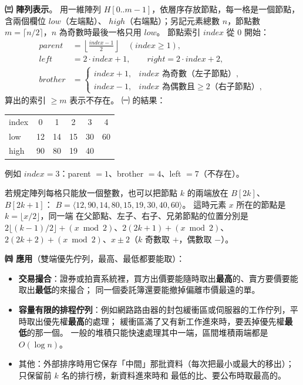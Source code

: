 \begin{pastsoln}
\textbf{㈢ 陣列表示}。 用一維陣列 $H[0..m-1]$，依層序存放節點，每一格是一個節點，含兩個欄位 $\mathit{low}$（左端點）、
$\mathit{high}$（右端點）；另記元素總數 $n$，節點數 $m = \lceil n/2 \rceil$，$n$ 為奇數時最後一格只用 $\mathit{low}$。
節點索引 $\mathit{index}$ 從 $0$ 開始：
\begin{align*}
\mathit{parent} &= \left\lfloor \frac{\mathit{index} - 1}{2} \right\rfloor \quad (\mathit{index} \ge 1), \\
\mathit{left} &= 2 \cdot \mathit{index} + 1, \qquad \mathit{right} = 2 \cdot \mathit{index} + 2, \\
\mathit{brother} &= \begin{cases} \mathit{index} + 1, & \mathit{index} \text{ 為奇數（左子節點）}, \\
\mathit{index} - 1, & \mathit{index} \text{ 為偶數且} \ge 2 \text{（右子節點）}, \end{cases}
\end{align*}
算出的索引 $\ge m$ 表示不存在。 ㈠ 的結果：
\begin{center}
\small
\begin{tabular}{l*{5}{|c}|}
index & 0 & 1 & 2 & 3 & 4 \\ 
low & 12 & 14 & 15 & 30 & 60 \\ 
high & 90 & 80 & 19 & 40 & \\ 
\end{tabular}
\end{center}
例如 $\mathit{index} = 3$：parent $= 1$、brother $= 4$、left $= 7$（不存在）。

若規定陣列每格只能放一個整數，也可以把節點 $k$ 的兩端放在 $B[2k]$、$B[2k+1]$：
$B = \langle 12, 90, 14, 80, 15, 19, 30, 40, 60 \rangle$。 這時元素 $x$ 所在的節點是 $k = \lfloor x/2 \rfloor$，同一端
在父節點、左子、右子、兄弟節點的位置分別是 $2\lfloor (k-1)/2 \rfloor + (x \bmod 2)$、$2(2k+1) + (x \bmod 2)$、
$2(2k+2) + (x \bmod 2)$、$x \pm 2$（$k$ 奇數取 $+$，偶數取 $-$）。

\textbf{㈣ 應用}（雙端優先佇列，最高、最低都要能取）：
\begin{itemize}
\item \textbf{交易撮合}：證券或拍賣系統裡，買方出價要能隨時取出\textbf{最高}的、賣方要價要能取出\textbf{最低}的來撮合；
同一個委託簿還要能撤掉偏離市價最遠的單。
\item \textbf{容量有限的排程佇列}：例如網路路由器的封包緩衝區或伺服器的工作佇列，平時取出優先權\textbf{最高}的處理；
緩衝區滿了又有新工作進來時，要丟掉優先權\textbf{最低}的那一個。 一般的堆積只能快速處理其中一端，區間堆積兩端都是
$O(\log n)$。
\item 其他：外部排序時用它保存「中間」那批資料（每次把最小或最大的移出）；只保留前 $k$ 名的排行榜，新資料進來時和
最低的比、要公布時取最高的。
\end{itemize}
\end{pastsoln}
